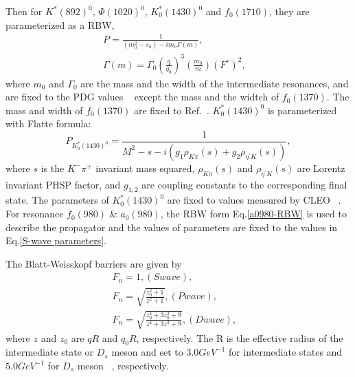 {    Then for $K^{*}(892)^{0}$, $\Phi(1020)^{0}$, $K_{0}^{*}(1430)^{0}$ and  $f_{0}(1710)$, they are parameterized as a RBW,
    \begin{equation}
        \begin{array}{lr}
            P = \frac{1}{(m_{0}^{2} - s_{a} ) - im_{0}\Gamma(m)}, &\\
            \Gamma(m) = \Gamma_{0}\left(\frac{q}{q_{0}}\right)^{3}\left(\frac{m_{0}}{m}\right)\left(F^{r}\right)^{2}, &
        \end{array}\label{RBW} 
    \end{equation}
    where $m_{0}$ and $\Gamma_{0}$ are the mass and the width of the intermediate resonances, and are fixed to the PDG values ~\cite{PDG2018} except the mass and the widtch of $f_{0}(1370)$. The mass and width of $f_{0}(1370)$ are fixed to Ref.~\cite{para-f01370}.
$K^{*}_{0}(1430)^{0}$ is parameterized with Flatte formula:
    \begin{equation}
        P_{K^{*}_{0}(1430)^{0}}= \frac{1}{M^{2} - s - i(g_{1}\rho_{K\pi}(s) + g_{2}\rho_{\eta^{'}K}(s))}, \label{Flatte}
    \end{equation}
    where $s$ is the $K^{-}\pi^{+}$ invariant mass squared,  $\rho_{K\pi}(s)$ and $\rho_{\eta^{'}K}(s)$ are Lorentz invariant PHSP factor, and   $g_{1,2}$ are coupling constants to the corresponding final state. The parameters of $K^{*}_{0}(1430)^{0}$ are fixed to values measured by CLEO ~\cite{CLEO-Flatte}. For resonance $f_{0}(980)$ \& $a_{0}(980)$, the RBW form Eq.\ref{a0980-RBW} is used to describe the propagator and the values of parameters are fixed to the values in Eq.\ref{S-wave parameters}.
    
    The Blatt-Weisskopf barriers are given by 
    \begin{equation}
        \begin{array}{lr}
            F_{n} = 1,           (S wave), &\\
            F_{n} = \sqrt{\frac{z_{0}^{2}+1}{z^{2}+1}},          (P wave), &\\
            F_{n} = \sqrt{\frac{z_{0}^{4}+3z_{0}^{2}+9}{z^{4}+3z^{2}+9}},       (D wave), &
        \end{array}\label{Blatt-Weisskopf barrier} 
    \end{equation}
    where $z$ and $z_{0}$ are $qR$ and $q_{0}R$, respectively. The R is the effective radius of the intermediate state or $D_{s}$ meson and set to $3.0GeV^{-1}$ for intermediate states and $5.0GeV^{-1}$  for $D_{s}$ meson ~\cite{Doc-DB-416-v30}, respectively.

}
